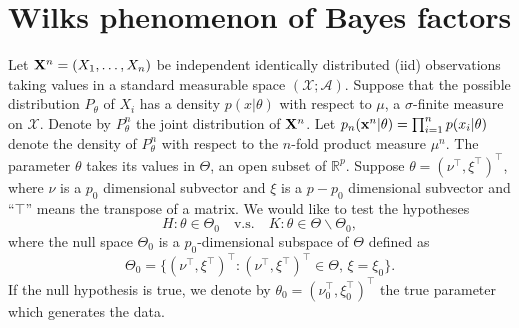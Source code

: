 \documentclass[11pt]{article}
\theoremstyle{plain}
\theoremstyle{definition}
\theoremstyle{remark}
\begin{document}





%








\section{Wilks phenomenon of Bayes factors}


Let $\mathbf{X}^{n}=(X_1,\ldots,X_n)$ be independent identically distributed (iid) observations taking values in a standard measurable space $(\mathcal{X};\mathscr{A})$.
Suppose that the possible distribution $P_\theta$ of $X_i$ has a density $p(x|\theta)$ with respect to $\mu$, a $\sigma$-finite measure on $\mathcal{X}$.
Denote by $P_{\theta}^{n}$ the joint distribution of $\mathbf{X}^{n}$.
Let $p_{n}(\mathbf{x}^{n}|\theta)=\prod_{i=1}^n p(x_i|\theta)$ denote the density of $P_{\theta}^n$ with respect to the $n$-fold product measure $\mu^n$.
The parameter $\theta$ takes its values in $\Theta$, an open subset of $\mathbb{R}^{p}$.
Suppose $\theta=(\nu^\top ,\xi^\top )^\top $, where $\nu$ is a $p_0$ dimensional subvector and $\xi$ is a $p-p_0$ dimensional subvector and ``$\top$'' means the transpose of a matrix.
 We would like to test the hypotheses
\begin{equation*}
    H:\theta\in\Theta_0\quad \text{v.s.}\quad K:\theta\in\Theta\backslash \Theta_0,
\end{equation*}
where the null space $\Theta_0$ is a $p_0$-dimensional subspace of $\Theta$ defined as
\begin{equation*}
    \Theta_0=\{(\nu^\top ,\xi^\top )^\top :(\nu^\top ,\xi^\top )^\top \in\Theta, \, \xi=\xi_0\}.
\end{equation*}
If the null hypothesis is true, we denote by $\theta_0=(\nu_0^\top ,\xi_0^\top )^\top $ the true parameter which generates the data.
\end{document}
